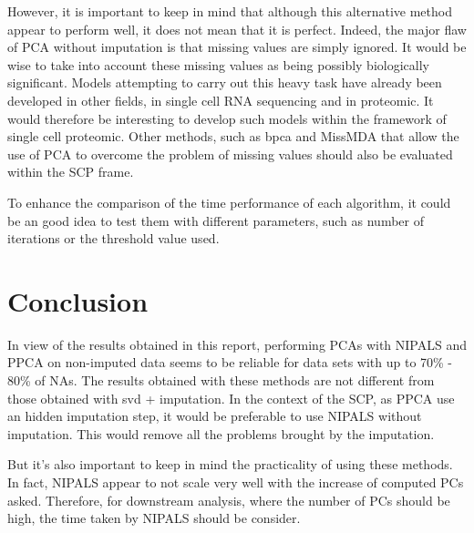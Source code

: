 \documentclass[a4paper, 11pt, twocolumn]{article}
\begin{document}
However, it is important to keep in mind that although this alternative method appear to perform well, it does not mean that it is perfect. Indeed, the major flaw of PCA without imputation is that missing values are simply ignored. It would be wise to take into account these missing values as being possibly biologically significant. Models attempting to carry out this heavy task have already been developed in other fields, in single cell RNA sequencing\citep{risso_general_2018} and in proteomic\citep{goeminne_msqrob_2020, obrien_effects_2018}. It would therefore be interesting to develop such models within the framework of single cell proteomic.
Other methods, such as bpca \citep{oba2003bayesian} and MissMDA \citep{missMDA} that allow the use of PCA to overcome the problem of missing values should also be evaluated within the SCP frame.

To enhance the comparison of the time performance of each algorithm, it could be an good idea to test them with different parameters, such as number of iterations or the threshold value used.  

\section{Conclusion} 
In view of the results obtained in this report, performing PCAs with NIPALS and PPCA on non-imputed data seems to be reliable for data sets with up to 70\% - 80\% of NAs. The results obtained with these methods are not different from those obtained with svd + imputation. 
In the context of the SCP, as PPCA use an hidden imputation step, it would be preferable to use NIPALS without imputation. This would remove all the problems brought by the imputation.

But it's also important to keep in mind the practicality of using these methods. In fact, NIPALS appear to not scale very well with the increase of computed PCs asked. Therefore, for downstream analysis, where the number of PCs should be high, the time taken by NIPALS should be consider.



\end{document}
